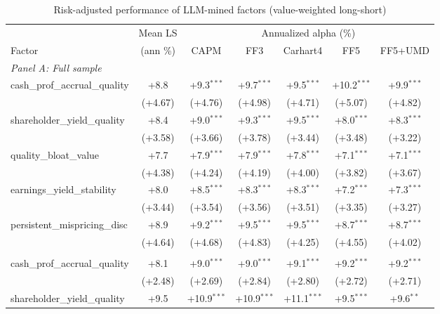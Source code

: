 \begin{table}[htbp]\centering
\caption{Risk-adjusted performance of LLM-mined factors (value-weighted long-short)}
\label{tab:alphas_vw}
\begin{threeparttable}\footnotesize
\begin{tabular}{lcccccc}
\toprule
 & Mean LS & \multicolumn{5}{c}{Annualized alpha (\%)} \\
\cmidrule(lr){3-7}
Factor & (ann \%) & CAPM & FF3 & Carhart4 & FF5 & FF5+UMD \\
\midrule
\multicolumn{7}{l}{\textit{Panel A: Full sample}} \\
\addlinespace
cash\_prof\_accrual\_quality & +8.8 & +9.3$^{***}$ & +9.7$^{***}$ & +9.5$^{***}$ & +10.2$^{***}$ & +9.9$^{***}$ \\
 & (+4.67) & (+4.76) & (+4.98) & (+4.71) & (+5.07) & (+4.82) \\
\addlinespace
shareholder\_yield\_quality & +8.4 & +9.0$^{***}$ & +9.3$^{***}$ & +9.5$^{***}$ & +8.0$^{***}$ & +8.3$^{***}$ \\
 & (+3.58) & (+3.66) & (+3.78) & (+3.44) & (+3.48) & (+3.22) \\
\addlinespace
quality\_bloat\_value & +7.7 & +7.9$^{***}$ & +7.9$^{***}$ & +7.8$^{***}$ & +7.1$^{***}$ & +7.1$^{***}$ \\
 & (+4.38) & (+4.24) & (+4.19) & (+4.00) & (+3.82) & (+3.67) \\
\addlinespace
earnings\_yield\_stability & +8.0 & +8.5$^{***}$ & +8.3$^{***}$ & +8.3$^{***}$ & +7.2$^{***}$ & +7.3$^{***}$ \\
 & (+3.44) & (+3.54) & (+3.56) & (+3.51) & (+3.35) & (+3.27) \\
\addlinespace
persistent\_mispricing\_disc & +8.9 & +9.2$^{***}$ & +9.5$^{***}$ & +9.5$^{***}$ & +8.7$^{***}$ & +8.7$^{***}$ \\
 & (+4.64) & (+4.68) & (+4.83) & (+4.25) & (+4.55) & (+4.02) \\
\addlinespace
\midrule
\multicolumn{7}{l}{\textit{Panel B: Out-of-sample (post-2000-12-31)}} \\
\addlinespace
cash\_prof\_accrual\_quality & +8.1 & +9.0$^{***}$ & +9.0$^{***}$ & +9.1$^{***}$ & +9.2$^{***}$ & +9.2$^{***}$ \\
 & (+2.48) & (+2.69) & (+2.84) & (+2.80) & (+2.72) & (+2.71) \\
\addlinespace
shareholder\_yield\_quality & +9.5 & +10.9$^{***}$ & +10.9$^{***}$ & +11.1$^{***}$ & +9.5$^{***}$ & +9.6$^{**}$ \\

\end{tabular}
\end{threeparttable}
\end{table}
